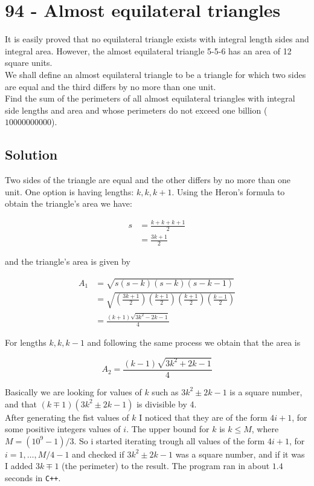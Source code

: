 \chapter*{94 - Almost equilateral triangles}

It is easily proved that no equilateral triangle exists with integral length sides and integral area. However, the almost equilateral triangle 5-5-6 has an area of 12 square units.\\

We shall define an almost equilateral triangle to be a triangle for which two sides are equal and the third differs by no more than one unit.\\

Find the sum of the perimeters of all almost equilateral triangles with integral side lengths and area and whose perimeters do not exceed one billion ($10000000000$).\\

\section*{Solution}

Two sides of the triangle are equal and the other differs by no more than one unit. One option is having lengths: $k,k,k+1$. Using the Heron's formula to obtain the triangle's area we have:

\begin{align*}
    s &= \frac{k + k + k+1}{2} \\
    &= \frac{3k+1}{2}
\end{align*}

and the triangle's area is given by

\begin{align*}
    A_1 &= \sqrt{s(s-k)(s-k)(s-k-1)}\\
    &= \sqrt{\left ( \frac{3k+1}{2} \right ) \left ( \frac{k+1}{2} \right ) \left ( \frac{k+1}{2} \right ) \left ( \frac{k-1}{2} \right )}\\
    &= \frac{(k+1) \sqrt{3k^2 - 2k - 1}}{4}
\end{align*}

For lengths $k,k,k-1$ and following the same process we obtain that the area is 

$$
A_2 = \frac{(k-1) \sqrt{3k^2 + 2k - 1}}{4}
$$

Basically we are looking for values of $k$ such as $3k^2 \pm 2k - 1$ is a square number, and that $(k \mp 1)(3k^2 \pm 2k - 1)$ is divisible by 4.\\

After generating the fist values of $k$ I noticed that they are of the form $4i+1$, for some positive integers values of $i$. The upper bound for $k$ is $k \leq M$, where $M = (10^9-1)/3$. So i started iterating trough all values of the form $4i+1$, for $i=1, \ldots, M/4-1$ and checked if $3k^2 \pm 2k - 1$ was a square number, and if it was I added $3k \mp 1$ (the perimeter) to the result. The program ran in about $1.4$ seconds in \texttt{C++}.
